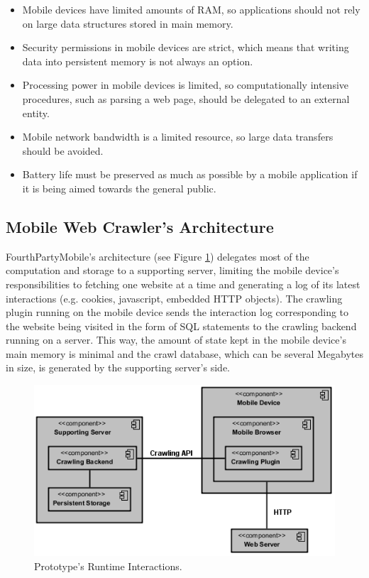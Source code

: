 \documentclass{acm_proc_article-sp}
\begin{document}
\begin{itemize}
\item Mobile devices have limited amounts of RAM, so applications should not rely on large data structures stored in main memory.

\item Security permissions in mobile devices are strict, which means that writing data into persistent memory is not always an option.

\item Processing power in mobile devices is limited, so computationally intensive procedures, such as parsing a web page, should be delegated to an external entity.

\item Mobile network bandwidth is a limited resource, so large data transfers should be avoided.

\item Battery life must be preserved as much as possible by a mobile application if it is being aimed towards the general public.
\end{itemize}


\subsection{Mobile Web Crawler's Architecture}

FourthPartyMobile's architecture (see Figure \ref{fig:component_diagram}) delegates most of the computation and storage to a supporting server, limiting the mobile device’s responsibilities to fetching one website at a time and generating a log of its latest interactions (e.g. cookies, javascript, embedded HTTP objects). The crawling plugin running on the mobile device sends the interaction log corresponding to the website being visited in the form of SQL statements to the crawling backend running on a server. This way, the amount of state kept in the mobile device’s main memory is minimal and the crawl database, which can be several Megabytes in size, is generated by the supporting server's side. 

\begin{figure}[h] 
\centering \includegraphics[scale=0.70]{diagrams/component_diagram.png}
\caption{Prototype's Runtime Interactions.}
\label{fig:component_diagram}
\end{figure}
\end{document}
